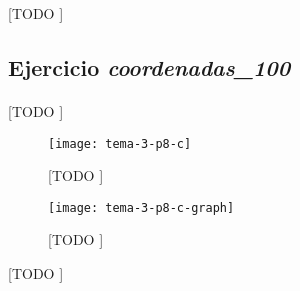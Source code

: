 \documentclass[spanish]{article}
\begin{document}
			\begin{table}[h]
				\begin{center}
				\end{center}
				\caption{[TODO ]}
				\label{}
			\end{table}

		\subsection{Ejercicio \emph{coordenadas\_100}}
		\label{sec:e-8c}

			\paragraph{}
			[TODO ]

			\begin{figure}[h]
				\begin{center}
					\texttt{[image: tema-3-p8-c]}
				\end{center}
				\caption{[TODO ]}
				\label{}
			\end{figure}

			\begin{figure}[h]
				\begin{center}
					\texttt{[image: tema-3-p8-c-graph]}
				\end{center}
				\caption{[TODO ]}
				\label{}
			\end{figure}

			\begin{table}[h]
				\begin{center}
				\end{center}
				\caption{[TODO ]}
				\label{}
			\end{table}

	\nocite{subject:mio}
	\nocite{garciparedes:mosel-examples}
	
  
\end{document}
